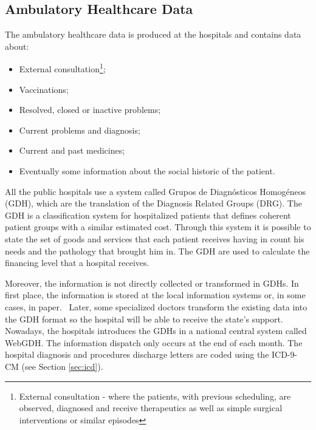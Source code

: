 
\subsection{Ambulatory Healthcare Data}

The ambulatory healthcare data is produced at the hospitals and contains data about:
\begin{itemize}
\item External consultation\footnote{External consultation - where the patients, with previous scheduling, are observed, diagnosed and receive therapeutics as well as simple surgical interventions or similar episodes};
\item Vaccinations;
\item Resolved, closed or inactive problems;
\item Current problems and diagnosis;
\item Current and past medicines;
\item Eventually some information about the social historic of the patient.
\end{itemize}

All the public hospitals use a system called Grupos de Diagnósticos Homogéneos (GDH), which are the translation of the  Diagnosis Related Groups (DRG). The GDH is a classification system for hospitalized patients that defines coherent patient groups with a similar estimated cost. Through this system it is possible to state the set of goods and services that each patient receives having in count his needs and the pathology that brought him in. The GDH are used to calculate the financing level that a hospital receives.~\citep{GDH2011}

Moreover, the information is not directly collected or transformed in GDHs. In first place, the information is stored at the local information systems or, in some cases, in paper.~\citep{Ferreira2008} Later, some specialized doctors transform the existing data into the GDH format so the hospital will be able to receive the state's support. Nowadays, the hospitals introduces the GDHs in a national central system called WebGDH. The information dispatch only occurs at the end of each month. The hospital diagnosis and procedures discharge letters are coded using the ICD-9-CM (see Section \ref{sec:icd}).


